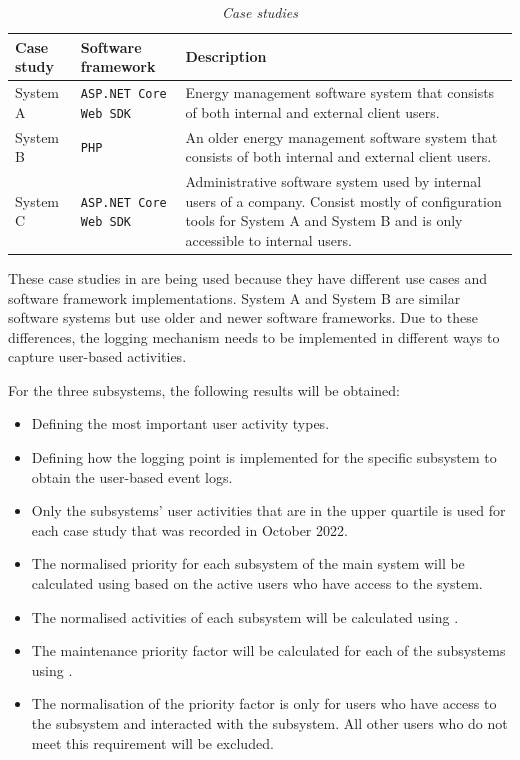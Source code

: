 \begin{table}[!htb]
	\centering
	\caption[Case studies]
	{\textit{Case studies}}
	\label{tbl:ch3_caseStudies}
	\begin{tabularx}{\textwidth}{|X|X|X|}
		\hline \textbf{Case study} & \textbf{Software framework} & \textbf{Description} \\
		\hline System A & \texttt{ASP.NET Core Web SDK} & \RaggedRight Energy management software system that consists of both internal and external client users. \\
		\hline System B & \texttt{PHP} & \RaggedRight An older energy management software system that consists of both internal and external client users. \\
		\hline System C & \texttt{ASP.NET Core Web SDK} & \RaggedRight Administrative software system used by internal users of a company. Consist mostly of configuration tools for System A and System B and is only accessible to internal users. \\
		\hline
	\end{tabularx}
\end{table}

These case studies in  are being used because they have different use cases and software framework implementations. System A and System B are similar software systems but use older and newer software frameworks. Due to these differences, the logging mechanism needs to be implemented in different ways to capture user-based activities.\par For the three subsystems, the following results will be obtained:

\begin{itemize}
\item Defining the most important user activity types.
\item Defining how the logging point is implemented for the specific subsystem to obtain the user-based event logs.
\item Only the subsystems' user activities that are in the upper quartile is used for each case study that was recorded in October 2022.
\item The normalised priority for each subsystem of the main system will be calculated using  based on the active users who have access to the system.
\item The normalised activities of each subsystem will be calculated using .
\item The maintenance priority factor will be calculated for each of the subsystems using .
\item The normalisation of the priority factor is only for users who have access to the subsystem and interacted with the subsystem. All other users who do not meet this requirement will be excluded.
\end{itemize}

